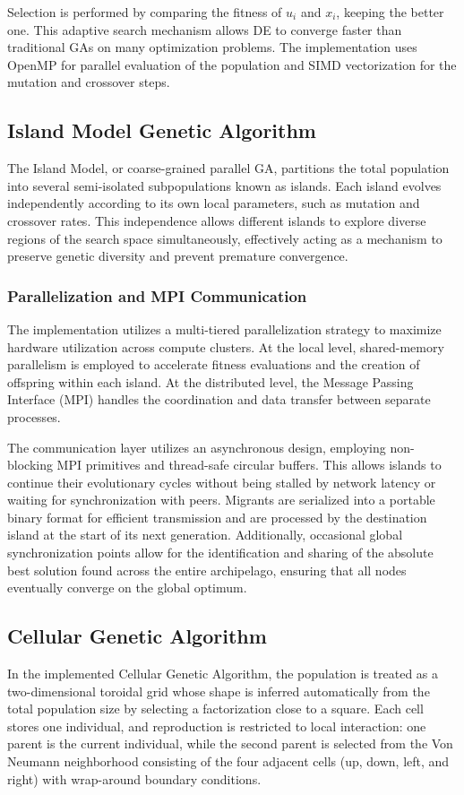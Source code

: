 \documentclass[conference]{IEEEtran}
\begin{document}
    Selection is performed by comparing the fitness of $u_i$ and $x_i$, keeping the better one. This adaptive search mechanism allows DE to converge faster than traditional GAs on many optimization problems. The implementation uses OpenMP for parallel evaluation of the population and SIMD vectorization for the mutation and crossover steps.

    \subsection{Island Model Genetic Algorithm}
    The Island Model, or coarse-grained parallel GA, partitions the total population into several semi-isolated subpopulations known as islands. Each island evolves independently according to its own local parameters, such as mutation and crossover rates. This independence allows different islands to explore diverse regions of the search space simultaneously, effectively acting as a mechanism to preserve genetic diversity and prevent premature convergence. 

    \subsubsection{Parallelization and MPI Communication}
    The implementation utilizes a multi-tiered parallelization strategy to maximize hardware utilization across compute clusters. At the local level, shared-memory parallelism is employed to accelerate fitness evaluations and the creation of offspring within each island. At the distributed level, the Message Passing Interface (MPI) handles the coordination and data transfer between separate processes. 

    The communication layer utilizes an asynchronous design, employing non-blocking MPI primitives and thread-safe circular buffers. This allows islands to continue their evolutionary cycles without being stalled by network latency or waiting for synchronization with peers. Migrants are serialized into a portable binary format for efficient transmission and are processed by the destination island at the start of its next generation. Additionally, occasional global synchronization points allow for the identification and sharing of the absolute best solution found across the entire archipelago, ensuring that all nodes eventually converge on the global optimum.

    \subsection{Cellular Genetic Algorithm}
    In the implemented Cellular Genetic Algorithm, the population is treated as a two-dimensional toroidal grid whose shape is inferred automatically from the total population size by selecting a factorization close to a square. Each cell stores one individual, and reproduction is restricted to local interaction: one parent is the current individual, while the second parent is selected from the Von Neumann neighborhood consisting of the four adjacent cells (up, down, left, and right) with wrap-around boundary conditions.
\end{document}
